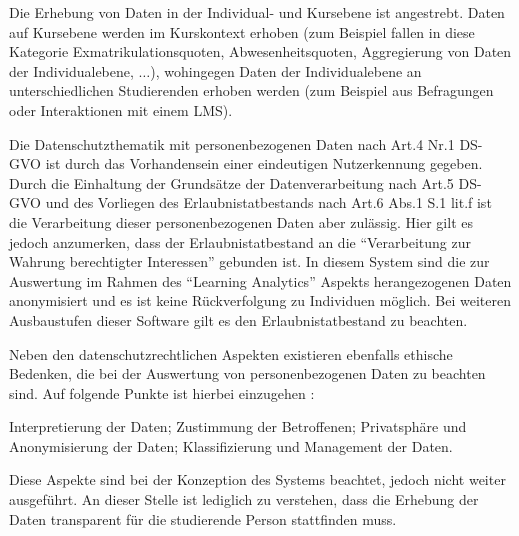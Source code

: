 Die Erhebung von Daten in der Individual- und Kursebene ist angestrebt. Daten auf Kursebene werden im Kurskontext erhoben (zum Beispiel fallen in diese Kategorie Exmatrikulationsquoten, Abwesenheitsquoten, Aggregierung von Daten der Individualebene, $\ldots$), wohingegen Daten der Individualebene an unterschiedlichen Studierenden erhoben werden (zum Beispiel aus Befragungen oder Interaktionen mit einem \ac{LMS}).

Die Datenschutzthematik mit personenbezogenen Daten nach Art.4 Nr.1 DS-GVO ist durch das Vorhandensein einer eindeutigen Nutzerkennung gegeben. Durch die Einhaltung der Grundsätze der Datenverarbeitung nach Art.5 DS-GVO und des Vorliegen des Erlaubnistatbestands nach Art.6 Abs.1 S.1 lit.f ist die Verarbeitung dieser personenbezogenen Daten aber  zulässig. Hier gilt es jedoch anzumerken, dass der Erlaubnistatbestand an die \enquote{Verarbeitung zur Wahrung berechtigter Interessen} gebunden ist. In diesem System sind die zur Auswertung im Rahmen des \enquote{Learning Analytics} Aspekts herangezogenen Daten anonymisiert und es ist keine Rückverfolgung zu Individuen möglich. Bei weiteren Ausbaustufen dieser Software gilt es den Erlaubnistatbestand zu beachten. 

Neben den datenschutzrechtlichen Aspekten existieren ebenfalls ethische Bedenken, die bei der Auswertung von personenbezogenen Daten zu beachten sind. Auf folgende Punkte ist hierbei einzugehen \autocite[S.1510]{learningAnalyticsEthicalUssuesAndDilemmas}:

	Interpretierung der Daten; Zustimmung der Betroffenen; Privatsphäre und Anonymisierung der Daten; Klassifizierung und Management der Daten.
	
Diese Aspekte sind bei der Konzeption des Systems beachtet, jedoch nicht weiter ausgeführt. An dieser Stelle ist lediglich zu verstehen, dass die Erhebung der Daten transparent für die studierende Person stattfinden muss. 
	


